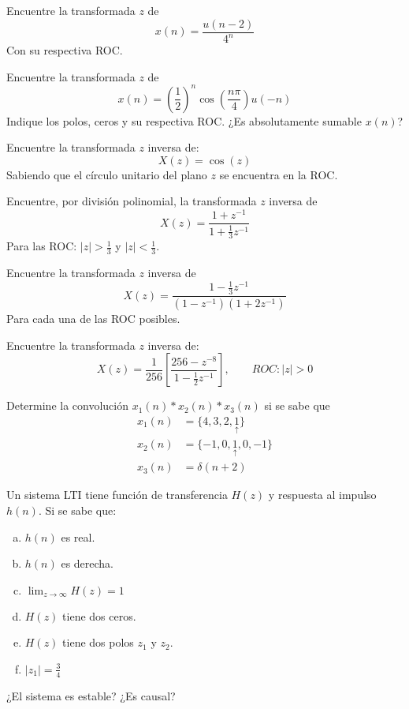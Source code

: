 \begin{ejercicio}
	Encuentre la transformada $z$ de
	$$ x(n) = \frac{u(n-2)}{4^n} $$
	Con su respectiva ROC.
\end{ejercicio}

\begin{ejercicio}
	Encuentre la transformada $z$ de 
	$$ x(n) = \left(\frac{1}{2}\right)^n \cos \left( \frac{n\pi}{4} \right) u(-n) $$
	Indique los polos, ceros y su respectiva ROC. ¿Es absolutamente sumable $x(n)$?
\end{ejercicio}

\begin{ejercicio}
	Encuentre la transformada $z$ inversa de:
	$$ X(z) = \cos (z) $$
	Sabiendo que el círculo unitario del plano $z$ se encuentra en la ROC.
\end{ejercicio}

\begin{ejercicio}
	Encuentre, por división polinomial, la transformada $z$ inversa de
	$$ X(z) = \frac{1+z^{-1}}{1+\frac{1}{3}z^{-1}} $$
	Para las ROC: $|z|>\frac{1}{3}$ y $|z|< \frac{1}{3}$.
\end{ejercicio}

\begin{ejercicio}
	Encuentre la transformada $z$ inversa de
	$$ X(z) = \frac{1-\frac{1}{3}z^{-1}}{(1-z^{-1})(1+2z^{-1})} $$
	Para cada una de las ROC posibles.
\end{ejercicio}

\begin{ejercicio}
	Encuentre la transformada $z$ inversa de:
	$$ X(z) = \frac{1}{256}\left[\dfrac{256-z^{-8}}{1-\frac{1}{2}z^{-1}} \right], \qquad ROC:|z|>0 $$
\end{ejercicio}

\begin{ejercicio}
	Determine la convolución $x_1(n)*x_2(n)*x_3(n)$ si se sabe que
	\begin{align*}
		x_1(n) &= \{ 4,3,2,\underset{\uparrow}{1} \} \\
		x_2(n) &= \{ -1,0,\underset{\uparrow}{1},0,-1 \} \\
		x_3(n) &= \delta(n+2)
	\end{align*}
\end{ejercicio}

\begin{ejercicio}
	Un sistema LTI tiene función de transferencia $H(z)$ y respuesta al impulso $h(n)$. Si se sabe que:
	\begin{enumerate}[a.]
		\item $h(n)$ es real.
		\item $h(n)$ es derecha.
		\item $\lim_{z\to\infty} H(z)=1$
		\item $H(z)$ tiene dos ceros.
		\item $H(z)$ tiene dos polos $z_1$ y $z_2$.
		\item $|z_1| = \frac{3}{4}$ 
	\end{enumerate}
	¿El sistema es estable? ¿Es causal?
\end{ejercicio}

